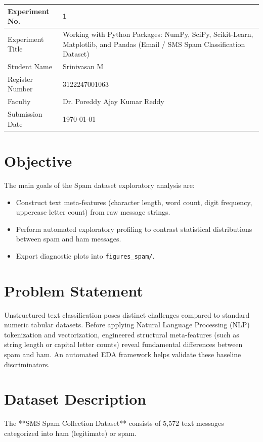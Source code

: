 \documentclass[12pt,a4paper]{article}
\begin{document}
\begin{tabular}{|p{4cm}|p{11cm}|}
\hline
Experiment No. & 1 \\ \hline
Experiment Title & Working with Python Packages: NumPy, SciPy, Scikit-Learn, Matplotlib, and Pandas (Email / SMS Spam Classification Dataset) \\ \hline
Student Name & Srinivasan M \\ \hline
Register Number & 3122247001063 \\ \hline
Faculty & Dr. Poreddy Ajay Kumar Reddy \\ \hline
Submission Date & \today \\ \hline
\end{tabular}

\vspace{0.3cm}

\section{Objective}
The main goals of the Spam dataset exploratory analysis are:
\begin{itemize}[noitemsep]
    \item Construct text meta-features (character length, word count, digit frequency, uppercase letter count) from raw message strings.
    \item Perform automated exploratory profiling to contrast statistical distributions between spam and ham messages.
    \item Export diagnostic plots into \texttt{figures\_spam/}.
\end{itemize}

\section{Problem Statement}
Unstructured text classification poses distinct challenges compared to standard numeric tabular datasets. Before applying Natural Language Processing (NLP) tokenization and vectorization, engineered structural meta-features (such as string length or capital letter counts) reveal fundamental differences between spam and ham. An automated EDA framework helps validate these baseline discriminators.

\section{Dataset Description}
The **SMS Spam Collection Dataset** consists of 5,572 text messages categorized into ham (legitimate) or spam.
\end{document}
